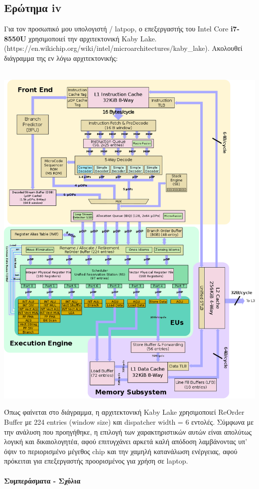 \subsection{Ερώτημα iv}
Για τον προσωπικό μου υπολογιστή / latpop, ο επεξεργαστής του Intel Core 
 \textbf{i7-8550U}
 χρησιμοποιεί την αρχιτεκτονική Kaby Lake.
 (https://en.wikichip.org/wiki/intel/microarchitectures/kaby\_lake). Ακολουθεί διάγραμμα 
 της εν λόγω αρχιτεκτονικής:
 \\
   \begin{minipage}{\textwidth}
      \begin{center}
         \\
         \vspace{3mm}
         \includegraphics[width=\textwidth]{./imgs/kaby.png}
         \vspace{6mm}
      \end{center}
   \end{minipage}

   Όπως φαίνεται στο διάγραμμα, η αρχιτεκτονική Kaby Lake χρησιμοποιεί ReOrder
   Buffer με 224 entries (window size) και dispatcher width = 6 εντολές. Σύμφωνα
   με την ανάλυση που προηγήθηκε, η επιλογή των χαρακτηριστικών αυτών είναι
   απολύτως λογική και δικαιολογητέα, αφού επιτυγχάνει αρκετά καλή απόδοση
   λαμβάνοντας υπ' όψιν το περιορισμένο μέγεθος chip και την χαμηλή κατανάλωση
   ενέργειας, αφού πρόκειται για επεξεργαστής προορισμένος για χρήση σε laptop. 


   \paragraph{Συμπεράσματα - Σχόλια}
